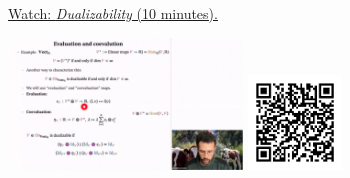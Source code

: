 
\begin{minipage}{10cm}
    \href{https://act4e-spring21.netlify.app/videos/spring2021-par-feedback:dualizability.html}{Watch: \emph{Dualizability} (10 minutes).}
        
    \href{https://act4e-spring21.netlify.app/videos/spring2021-par-feedback:dualizability.html}{\includegraphics[height=3.5cm]{spring2021-par-feedback:dualizability/thumbnails.jpg}}
    \href{https://act4e-spring21.netlify.app/videos/spring2021-par-feedback:dualizability.html}{\includegraphics[height=2.5cm]{spring2021-par-feedback:dualizability/qrcode.png}}
\end{minipage}
